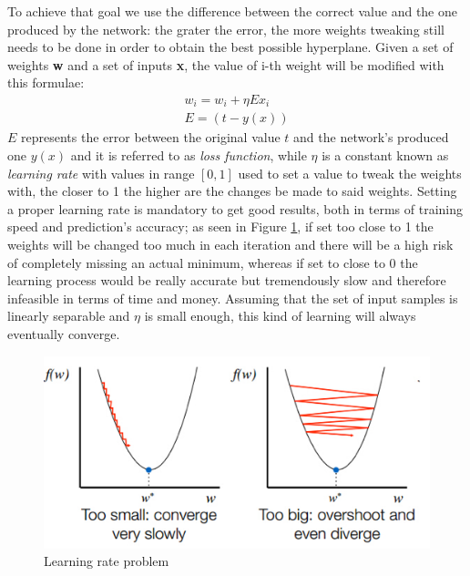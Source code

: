 \documentclass[11pt,a4paper,titlepage]{book}
\begin{document}
To achieve that goal we use the difference between the correct value and the one produced by the network: the grater the error, the more weights tweaking still needs to be done in order to obtain the best possible hyperplane. 
\newline
Given a set of weights \textbf{w} and a set of inputs \textbf{x}, the value of i-th weight will be modified with this formulae:
\begin{align}
    w_i = w_i + \eta E x_i \\
    E = (t - y(x))
\end{align}
$E$ represents the error between the original value $t$ and the network's produced one $y(x)$ and it is referred to as \textit{loss function}, while $\eta$ is a constant known as \textit{learning rate} with values in range $[0, 1]$ used to set a value to tweak the weights with, the closer to 1 the higher are the changes be made to said weights.
\newline
\newline
Setting a proper learning rate is mandatory to get good results, both in terms of training speed and prediction's accuracy; as seen in Figure \ref{learning_rate}, if set too close to 1 the weights will be changed too much in each iteration and there will be a high risk of completely missing an actual minimum, whereas if set to close to 0 the learning process would be really accurate but tremendously slow and therefore infeasible in terms of time and money.
\newline
\newline
Assuming that the set of input samples is linearly separable and $\eta$ is small enough, this kind of learning will always eventually converge.
\begin{figure}[ht]
    \includegraphics[scale=0.60]{imgs/ch_1/learning_rate.png}
    \centering
    \caption{Learning rate problem}
    \label{learning_rate}
\end{figure}
\end{document}
